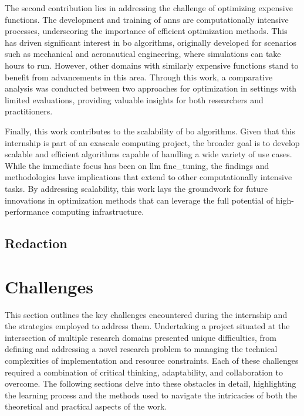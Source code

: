 The second contribution lies in addressing the challenge of optimizing expensive functions. The development and training of \acrshort{ann}s are computationally intensive processes, underscoring the importance of efficient optimization methods. This has driven significant interest in \acrshort{bo} algorithms, originally developed for scenarios such as mechanical and aeronautical engineering, where simulations can take hours to run. However, other domains with similarly expensive functions stand to benefit from advancements in this area. Through this work, a comparative analysis was conducted between two approaches for optimization in settings with limited evaluations, providing valuable insights for both researchers and practitioners.

Finally, this work contributes to the scalability of \acrshort{bo} algorithms. Given that this internship is part of an exascale computing project, the broader goal is to develop scalable and efficient algorithms capable of handling a wide variety of use cases. While the immediate focus has been on \acrshort{llm} \gls{fine_tuning}, the findings and methodologies have implications that extend to other computationally intensive tasks. By addressing scalability, this work lays the groundwork for future innovations in optimization methods that can leverage the full potential of high-performance computing infrastructure.


\subsection{Redaction}
\label{sec:redaction}




\section{Challenges}
\label{sec:challenge}

This section outlines the key challenges encountered during the internship and the strategies employed to address them. Undertaking a project situated at the intersection of multiple research domains presented unique difficulties, from defining and addressing a novel research problem to managing the technical complexities of implementation and resource constraints. Each of these challenges required a combination of critical thinking, adaptability, and collaboration to overcome. The following sections delve into these obstacles in detail, highlighting the learning process and the methods used to navigate the intricacies of both the theoretical and practical aspects of the work.



